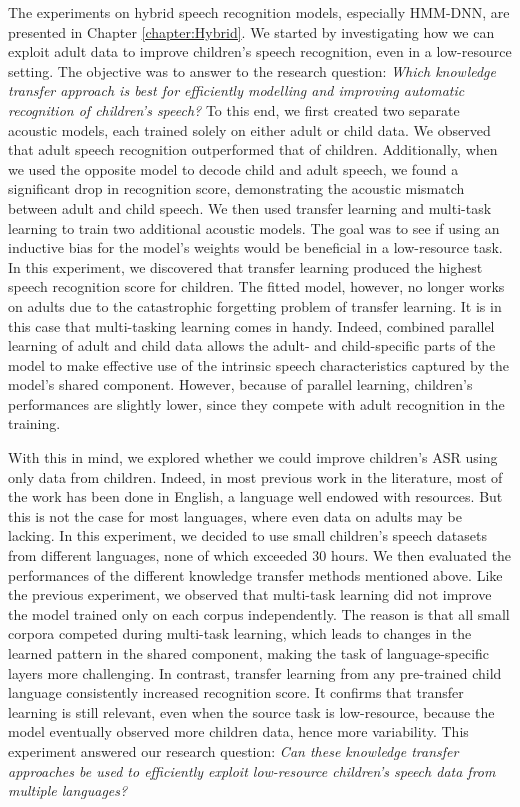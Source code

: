 The experiments on hybrid speech recognition models, especially HMM-DNN, are presented in Chapter \ref{chapter:Hybrid}. We started by investigating how we can exploit adult data to improve children's speech recognition, even in a low-resource setting. The objective was to answer to the research question: \textit{Which knowledge transfer approach is best for efficiently modelling and improving automatic recognition of children's speech?} To this end, we first created two separate acoustic models, each trained solely on either adult or child data. We observed that adult speech recognition outperformed that of children. Additionally, when we used the opposite model to decode child and adult speech, we found a significant drop in recognition score, demonstrating the acoustic mismatch between adult and child speech. We then used transfer learning and multi-task learning to train two additional acoustic models. The goal was to see if using an inductive bias for the model's weights would be beneficial in a low-resource task. In this experiment,  we discovered that transfer learning produced the highest speech recognition score for children. The fitted model, however, no longer works on adults due to the catastrophic forgetting problem of transfer learning. It is in this case that multi-tasking learning comes in handy. Indeed, combined parallel learning of adult and child data allows the adult- and child-specific parts of the model to make effective use of the intrinsic speech characteristics captured by the model's shared component. However, because of parallel learning, children's performances are slightly lower, since they compete with adult recognition in the training.

With this in mind, we explored whether we could improve children's ASR using only data from children. Indeed, in most previous work in the literature, most of the work has been done in English, a language well endowed with resources. But this is not the case for most languages, where even data on adults may be lacking. In this experiment, we decided to use small children's speech datasets from different languages, none of which exceeded 30 hours. We then evaluated the performances of the different knowledge transfer methods mentioned above. Like the previous experiment, we observed that multi-task learning did not improve the model trained only on each corpus independently. The reason is that all small corpora competed during multi-task learning, which leads to changes in the learned pattern in the shared component, making the task of language-specific layers more challenging. In contrast, transfer learning from any pre-trained child language consistently increased recognition score. It confirms that transfer learning is still relevant, even when the source task is low-resource, because the model eventually observed more children data, hence more variability. This experiment answered our research question: \textit{Can these knowledge transfer approaches be used to efficiently exploit low-resource children's speech data from multiple languages?
}

